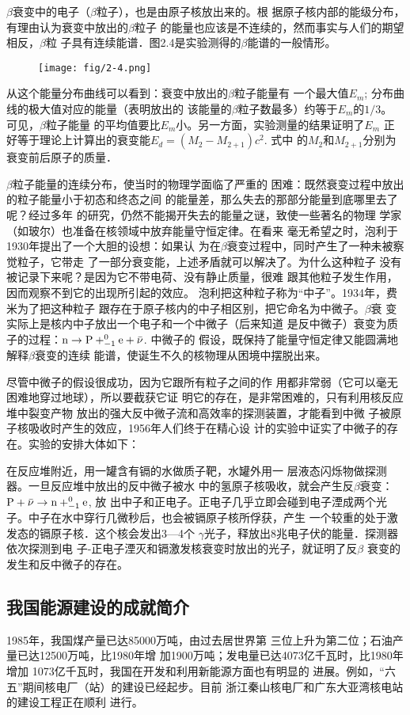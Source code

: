 $\beta$衰变中的电子（$\beta$粒子），也是由原子核放出来的。根
据原子核内部的能级分布，有理由认为衰变中放出的$\beta$粒子
的能量也应该是不连续的，然而事实与人们的期望相反，$\beta$粒
子具有连续能谱．图2.4是实验测得的$\beta$能谱的一般情形。
\begin{figure}[htp]
    \centering
\texttt{[image: fig/2-4.png]}
    \caption{}
\end{figure}

从这个能量分布曲线可以看到：衰变中放出的$\beta$粒子能量有
一个最大值$E_m$; 分布曲线的极大值对应的能量（表明放出的
该能量的$\beta$粒子数最多）约等于$E_m$的$1/3$。
可见，$\beta$粒子能量
的平均值要比$E_m$小。另一方面，实验测量的结果证明了$E_m$
正好等于理论上计算出的衰变能$E_d=(M_2-M_{2+1})c^2$. 式中
的$M_2$和$M_{2+1}$分别为衰变前后原子的质量．

$\beta$粒子能量的连续分布，使当时的物理学面临了严重的
困难：既然衰变过程中放出的粒子能量小于初态和终态之间
的能量差，那么失去的那部分能量到底哪里去了呢？经过多年
的研究，仍然不能揭开失去的能量之谜，致使一些著名的物理
学家（如玻尔）也准备在核领域中放弃能量守恒定律。在看来
毫无希望之时，泡利于1930年提出了一个大胆的设想：如果认
为在$\beta$衰变过程中，同时产生了一种未被察觉粒子，它带走
了一部分衰变能，上述矛盾就可以解决了。为什么这种粒子
没有被记录下来呢？是因为它不带电荷、没有静止质量，很难
跟其他粒子发生作用，因而观察不到它的出现所引起的效应。
泡利把这种粒子称为“中子”。1934年，费米为了把这种粒子
跟存在于原子核内的中子相区别，把它命名为中微子。$\beta$衰
变实际上是核内中子放出一个电子和一个中微子（后来知道
是反中微子）衰变为质子的过程：${\rm n}\to {\rm P}+^0_{-1}{\rm e}+\bar{\nu}$. 中微子的
假设，既保持了能量守恒定律又能圆满地解释$\beta$衰变的连续
能谱，使诞生不久的核物理从困境中摆脱出来。

尽管中微子的假设很成功，因为它跟所有粒子之间的作
用都非常弱（它可以毫无困难地穿过地球），所以要截获它证
明它的存在，是非常困难的，只有利用核反应堆中裂变产物
放出的强大反中微子流和高效率的探测装置，才能看到中微
子被原子核吸收时产生的效应，1956年人们终于在精心设
计的实验中证实了中微子的存在。实验的安排大体如下：

在反应堆附近，用一罐含有镉的水做质子靶，水罐外用一
层液态闪烁物做探测器。一旦反应堆中放出的反中微子被水
中的氢原子核吸收，就会产生反$\beta$衰变：${\rm P}+\bar{\nu}\to {\rm n}+ ^0_{-1}{\rm e}$, 放
出中子和正电子。正电子几乎立即会碰到电子湮成两个光
子。中子在水中穿行几微秒后，也会被镉原子核所俘获，产生
一个较重的处于激发态的镉原子核．这个核会发出3—4个
$\gamma$光子，释放出8兆电子伏的能量．探测器依次探测到电
子-正电子湮灭和镉激发核衰变时放出的光子，就证明了反$\beta$
衰变的发生和反中微子的存在。

\subsection{我国能源建设的成就简介}
1985年，我国煤产量已达85000万吨，由过去居世界第
三位上升为第二位；石油产量已达12500万吨，比1980年增
加1900万吨；发电量已达4073亿千瓦时，比1980年增加
1073亿千瓦时，我国在开发和利用新能源方面也有明显的
进展。例如，“六五”期间核电厂（站）的建设已经起步。目前
浙江秦山核电厂和广东大亚湾核电站的建设工程正在顺利
进行。





